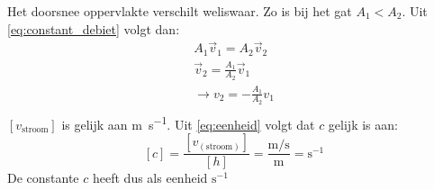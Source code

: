\documentclass[numbers=endperiod]{scrartcl}
\begin{document}
Het doorsnee oppervlakte verschilt weliswaar. Zo is bij het gat $A_1 < A_2$. Uit \cref{eq:constant_debiet} volgt dan:
\begin{equation}
\begin{split}
    A_1\vec{v}_1 = A_2\vec{v}_2\\
    \vec{v}_2 = \frac{A_1}{A_2}\vec{v}_1\\
     \rightarrow v_2 = -\frac{A_1}{A_2}v_1\\
    \end{split}
    \end{equation}
$[v_{\text{stroom}}]$ is gelijk aan \si{\meter\per\second}. Uit \cref{eq:eenheid} volgt dat $c$ gelijk is aan:
\begin{equation}\label{eq:eenheid}
[c] = \frac{[v_{(\text{stroom})}]}{[h]} = \frac{\si{\meter\per\second}}{\si{\meter}} = \si{\second}^{-1}
\end{equation}
De constante $c$ heeft dus als eenheid $\si{\second}^{-1}$




\newpage
\end{document}
